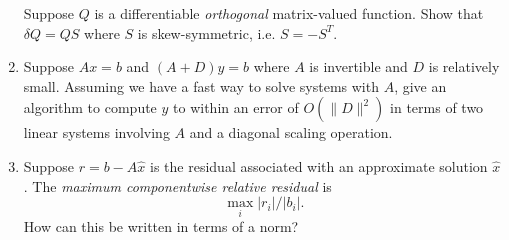\documentclass[12pt, leqno]{article}
\begin{document}
\begin{enumerate}
  Suppose $Q$ is a differentiable {\em orthogonal} matrix-valued
  function.  Show that $\delta Q = Q S$ where $S$ is skew-symmetric,
  i.e. $S = -S^T$.
\item
  Suppose $Ax = b$ and $(A+D) y = b$ where $A$ is invertible and $D$
  is relatively small.  Assuming we have a fast way to solve systems
  with $A$, give an algorithm to compute $y$ to within an error of
  $O(\|D\|^2)$ in terms of two linear systems involving $A$ and a
  diagonal scaling operation.
\item
  Suppose $r = b-A\hat{x}$ is the residual associated with an
  approximate solution $\hat{x}$.  The {\em maximum componentwise
    relative residual} is
  \[
    \max_i |r_i|/|b_i|.
  \]
  How can this be written in terms of a norm?
\end{enumerate}
\end{document}
